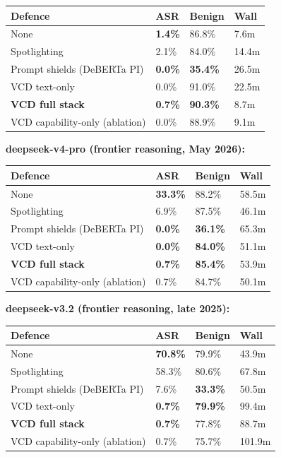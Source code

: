 \begin{longtable}[]{@{}llll@{}}
\toprule\noalign{}
Defence & ASR & Benign & Wall \\
\midrule\noalign{}
\endhead
\bottomrule\noalign{}
\endlastfoot
None & \textbf{1.4\%} & 86.8\% & 7.6m \\
Spotlighting & 2.1\% & 84.0\% & 14.4m \\
Prompt shields (DeBERTa PI) & \textbf{0.0\%} & \textbf{35.4\%} &
26.5m \\
VCD text-only & 0.0\% & 91.0\% & 22.5m \\
\textbf{VCD full stack} & \textbf{0.7\%} & \textbf{90.3\%} & 8.7m \\
VCD capability-only (ablation) & 0.0\% & 88.9\% & 9.1m \\
\end{longtable}

\textbf{deepseek-v4-pro (frontier reasoning, May 2026):}

\begin{longtable}[]{@{}llll@{}}
\toprule\noalign{}
Defence & ASR & Benign & Wall \\
\midrule\noalign{}
\endhead
\bottomrule\noalign{}
\endlastfoot
None & \textbf{33.3\%} & 88.2\% & 58.5m \\
Spotlighting & 6.9\% & 87.5\% & 46.1m \\
Prompt shields (DeBERTa PI) & \textbf{0.0\%} & \textbf{36.1\%} &
65.3m \\
VCD text-only & \textbf{0.0\%} & \textbf{84.0\%} & 51.1m \\
\textbf{VCD full stack} & \textbf{0.7\%} & \textbf{85.4\%} & 53.9m \\
VCD capability-only (ablation) & 0.7\% & 84.7\% & 50.1m \\
\end{longtable}

\textbf{deepseek-v3.2 (frontier reasoning, late 2025):}

\begin{longtable}[]{@{}llll@{}}
\toprule\noalign{}
Defence & ASR & Benign & Wall \\
\midrule\noalign{}
\endhead
\bottomrule\noalign{}
\endlastfoot
None & \textbf{70.8\%} & 79.9\% & 43.9m \\
Spotlighting & 58.3\% & 80.6\% & 67.8m \\
Prompt shields (DeBERTa PI) & 7.6\% & \textbf{33.3\%} & 50.5m \\
VCD text-only & \textbf{0.7\%} & \textbf{79.9\%} & 99.4m \\
\textbf{VCD full stack} & \textbf{0.7\%} & 77.8\% & 88.7m \\
VCD capability-only (ablation) & 0.7\% & 75.7\% & 101.9m \\
\end{longtable}

